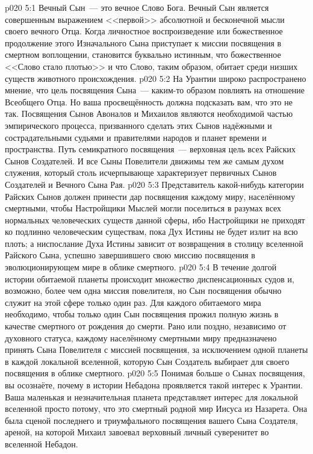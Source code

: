 \vs p020 5:1 Вечный Сын~--- это вечное Слово Бога. Вечный Сын является совершенным выражением <<первой>> абсолютной и бесконечной мысли своего вечного Отца. Когда личностное воспроизведение или божественное продолжение этого Изначального Сына приступает к миссии посвящения в смертном воплощении, становится буквально истинным, что божественное <<Слово стало плотью>> и что Слово, таким образом, обитает среди низших существ животного происхождения.
\vs p020 5:2 На Урантии широко распространено мнение, что цель посвящения Сына~--- каким\hyp{}то образом повлиять на отношение Всеобщего Отца. Но ваша просвещённость должна подсказать вам, что это не так. Посвящения Сынов Авоналов и Михаилов являются необходимой частью эмпирического процесса, призванного сделать этих Сынов надёжными и сострадательными судьями и правителями народов и планет времени и пространства. Путь семикратного посвящения~--- верховная цель всех Райских Сынов Создателей. И все Сыны Повелители движимы тем же самым духом служения, который столь исчерпывающе характеризует первичных Сынов Создателей и Вечного Сына Рая.
\vs p020 5:3 Представитель какой\hyp{}нибудь категории Райских Сынов должен принести дар посвящения каждому миру, населённому смертными, чтобы Настройщики Мыслей могли поселиться в разумах всех нормальных человеческих существ данной сферы, ибо Настройщики не приходят ко  подлинно человеческим существам, пока Дух Истины не будет излит на всю плоть; а ниспослание Духа Истины зависит от возвращения в столицу вселенной Райского Сына, успешно завершившего свою миссию посвящения в эволюционирующем мире в облике смертного.
\vs p020 5:4 В течение долгой истории обитаемой планеты происходит множество диспенсационных судов и, возможно, более чем одна миссия повелителя, но Сын посвящения обычно служит на этой сфере только один раз. Для каждого обитаемого мира необходимо, чтобы только один Сын посвящения прожил полную жизнь в качестве смертного от рождения до смерти. Рано или поздно, независимо от духовного статуса, каждому населённому смертными миру предназначено принять Сына Повелителя с миссией посвящения, за исключением одной планеты в каждой локальной вселенной, которую Сын Создатель выбирает для своего посвящения в облике смертного.
\vs p020 5:5 \pc Понимая больше о Сынах посвящения, вы осознаёте, почему в истории Небадона проявляется такой интерес к Урантии. Ваша маленькая и незначительная планета представляет интерес для локальной вселенной просто потому, что это смертный родной мир Иисуса из Назарета. Она была сценой последнего и триумфального посвящения вашего Сына Создателя, ареной, на которой Михаил завоевал верховный личный суверенитет во вселенной Небадон.
